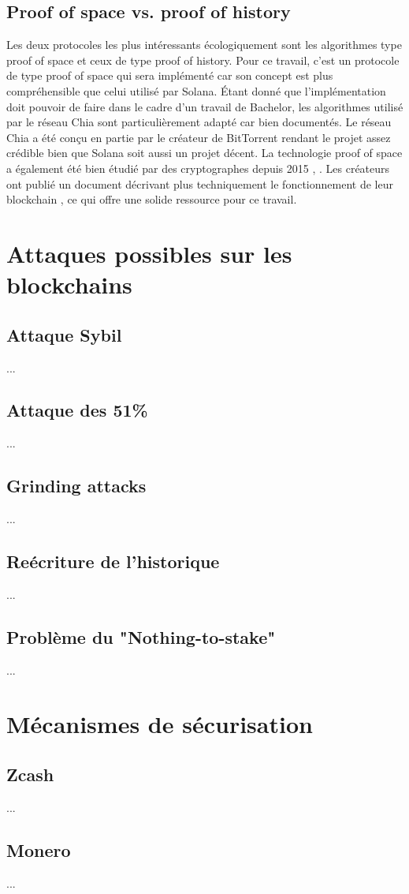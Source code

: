 \subsection{Proof of space vs. proof of history}

Les deux protocoles les plus intéressants écologiquement sont les algorithmes type proof of space et ceux de type proof of history. Pour ce travail, c'est un protocole de type proof of space qui sera implémenté car son concept est plus compréhensible que celui utilisé par Solana. Étant donné que l'implémentation doit pouvoir de faire dans le cadre d'un travail de Bachelor, les algorithmes utilisé par le réseau Chia sont particulièrement adapté car bien documentés. Le réseau Chia a été conçu en partie par le créateur de BitTorrent rendant le projet assez crédible bien que Solana soit aussi un projet décent. La technologie proof of space a également été bien étudié par des cryptographes depuis 2015 \cite{DBLP:conf/crypto/DziembowskiFKP15}, \cite{DBLP:conf/asiacrypt/AbusalahACKPR17}. Les créateurs ont publié un document décrivant plus techniquement le fonctionnement de leur blockchain \cite{chia:greenpaper}, ce qui offre une solide ressource pour ce travail.

\section{Attaques possibles sur les blockchains}

\subsection{Attaque Sybil}
...
\subsection{Attaque des 51\%}
...
\subsection{Grinding attacks}
...
\subsection{Reécriture de l'historique}
...
\subsection{Problème du "Nothing-to-stake"}
...

\section{Mécanismes de sécurisation}

\subsection{Zcash}
...
\subsection{Monero}
...